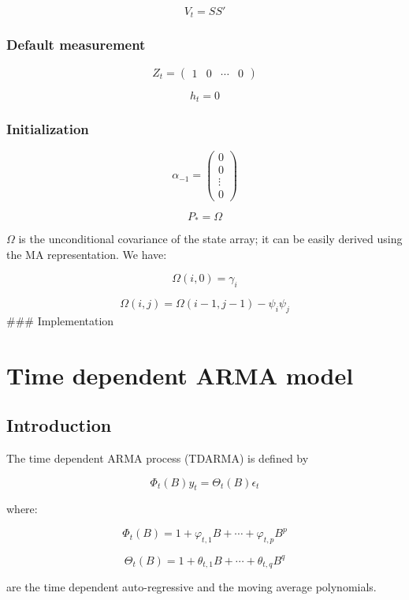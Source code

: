 \documentclass[
  letterpaper,
  DIV=11,
  numbers=noendperiod]{scrreprt}
\begin{document}
\[ V_t = S S' \]

\subsubsection{Default measurement}\label{default-measurement-1}

\[ Z_t = \begin{pmatrix} 1 & 0 & \cdots & 0\end{pmatrix}\]

\[ h_t = 0 \]

\subsubsection{Initialization}\label{initialization-1}

\[ \alpha_{-1} = \begin{pmatrix}0 \\ 0 \\ \vdots\\ 0 \end{pmatrix} \]

\[ P_{*} = \Omega \]

\(\Omega\) is the unconditional covariance of the state array; it can be
easily derived using the MA representation. We have:

\[ \Omega\left(i,0\right) = \gamma_i \]

\[ \Omega\left(i,j\right) = \Omega\left(i-1,j-1\right)-\psi_i \psi_j \]
\#\#\# Implementation

\section{Time dependent ARMA model}\label{time-dependent-arma-model}

\subsection{Introduction}\label{introduction-2}

The time dependent ARMA process (TDARMA) is defined by

\[ \Phi_t\left(B\right)y_t=\Theta_t\left(B\right)\epsilon_t \]

where:

\[\Phi_t\left(B\right)=1+\varphi_{t,1} B + \cdots + \varphi_{t,p} B^p \]

\[\Theta_t\left(B\right)=1+\theta_{t,1} B + \cdots + \theta_{t,q} B^q \]

are the time dependent auto-regressive and the moving average
polynomials.
\end{document}
